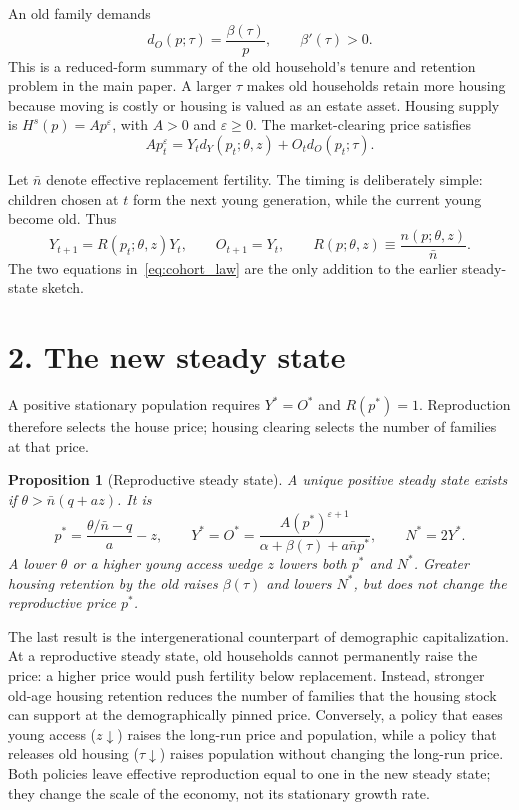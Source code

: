 \documentclass[11pt]{article}
\newtheorem{proposition}{Proposition}
\newcommand{\dY}{d_Y}
\newcommand{\dO}{d_O}
\begin{document}
An old family demands
\begin{equation}
 \dO(p;\tau)=\frac{\beta(\tau)}{p},
 \qquad \beta'(\tau)>0.
 \label{eq:old_demand}
\end{equation}
This is a reduced-form summary of the old household's tenure and retention
problem in the main paper. A larger $\tau$ makes old households retain more
housing because moving is costly or housing is valued as an estate asset.
Housing supply is $H^s(p)=A p^\varepsilon$, with $A>0$ and $\varepsilon\geq0$.
The market-clearing price satisfies
\begin{equation}
 A p_t^\varepsilon
 =Y_t\dY(p_t;\theta,z)+O_t\dO(p_t;\tau).
 \label{eq:clearing}
\end{equation}

Let $\bar n$ denote effective replacement fertility. The timing is deliberately
simple: children chosen at $t$ form the next young generation, while the current
young become old. Thus
\begin{equation}
 Y_{t+1}=R(p_t;\theta,z)Y_t,
 \qquad O_{t+1}=Y_t,
 \qquad
 R(p;\theta,z)\equiv\frac{n(p;\theta,z)}{\bar n}.
 \label{eq:cohort_law}
\end{equation}
The two equations in~\eqref{eq:cohort_law} are the only addition to the earlier
steady-state sketch.

\section*{2. The new steady state}

A positive stationary population requires $Y^*=O^*$ and $R(p^*)=1$.
Reproduction therefore selects the house price; housing clearing selects the
number of families at that price.

\begin{proposition}[Reproductive steady state]
\label{prop:ss}
A unique positive steady state exists if
$\theta>\bar n(q+az)$. It is
\begin{equation}
 p^*=\frac{\theta/\bar n-q}{a}-z,
 \qquad
 Y^*=O^*
 =\frac{A(p^*)^{\varepsilon+1}}
 {\alpha+\beta(\tau)+a\bar n p^*},
 \qquad N^*=2Y^* .
 \label{eq:ss}
\end{equation}
A lower $\theta$ or a higher young access wedge $z$ lowers both $p^*$ and
$N^*$. Greater housing retention by the old raises $\beta(\tau)$ and lowers
$N^*$, but does not change the reproductive price $p^*$.
\end{proposition}

The last result is the intergenerational counterpart of demographic
capitalization. At a reproductive steady state, old households cannot
permanently raise the price: a higher price would push fertility below
replacement. Instead, stronger old-age housing retention reduces the number of
families that the housing stock can support at the demographically pinned
price. Conversely, a policy that eases young access ($z\downarrow$) raises the
long-run price and population, while a policy that releases old housing
($\tau\downarrow$) raises population without changing the long-run price.
Both policies leave effective reproduction equal to one in the new steady
state; they change the scale of the economy, not its stationary growth rate.
\end{document}
